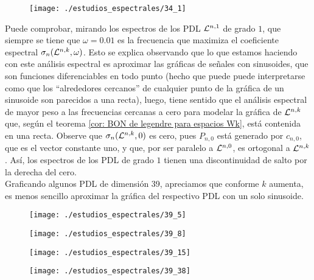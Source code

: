 \begin{figure}[H]
	\sidecaption{
	}
	\centering
	\texttt{[image: ./estudios\_espectrales/34\_1]} 
\end{figure}	

Puede comprobar, mirando los espectros
de los PDL $\mathcal{L}^{n,1}$ de grado $1$,
que siempre se tiene que $ \omega = 0.01$ es la frecuencia
que maximiza el coeficiente espectral
$\sigma_{n}(\mathcal{L}^{n,k}, \omega)$.
Esto se explica observando que
lo que estamos haciendo con este análisis espectral
es aproximar las gráficas de señales con sinusoides, que son
funciones diferenciables en todo punto
(hecho que puede
puede interpretarse
como que los ``alrededores
cercanos'' de cualquier
punto de la gráfica de un sinusoide son 
parecidos a una recta), luego, tiene sentido que  
el análisis espectral de mayor peso a las 
frecuencias cercanas a cero
para modelar la gráfica de $\mathcal{L}^{n,k}$
que, según el teorema 
\ref{cor: BON de legendre para espacios Wk}, está contenida
en una recta. Observe que 
$\sigma_{n}(\mathcal{L}^{n,k}, 0)$ es cero, pues
$P_{n, 0}$ está generado por
$c_{n,0}$, que es el vector constante uno, y que,
por ser paralelo a $\mathcal{L}^{n,0}$,
es ortogonal a $\mathcal{L}^{n,k}$. Así, los espectros
de los PDL de grado $1$ tienen una discontinuidad de salto
por la derecha del cero. \\


Graficando algunos PDL de dimensión
39, apreciamos que conforme $k$ aumenta, es menos
sencillo aproximar la gráfica del respectivo PDL
con un solo sinusoide.
\begin{figure}[H]
	\centering
	\texttt{[image: ./estudios\_espectrales/39\_5]} 
\end{figure}	
\begin{figure}[H]
	\centering
	\texttt{[image: ./estudios\_espectrales/39\_8]} 
\end{figure}	
\begin{figure}[H]
	\centering
	\texttt{[image: ./estudios\_espectrales/39\_15]} 
\end{figure}	
\begin{figure}[H]
	\centering
	\texttt{[image: ./estudios\_espectrales/39\_38]} 
\end{figure}	

